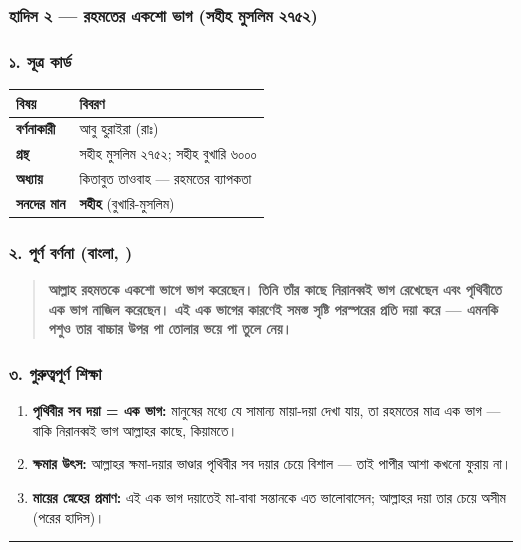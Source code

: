 \subsubsection*{হাদিস ২ — রহমতের একশো ভাগ (সহীহ মুসলিম ২৭৫২)}

\subsubsection*{১. সূত্র কার্ড}

\begin{table}[h]\centering\small
\begin{tabular}{ll}
বিষয় & বিবরণ \\
\hline
\textbf{বর্ণনাকারী} & আবু হুরাইরা (রাঃ) \\
\textbf{গ্রন্থ} & সহীহ মুসলিম ২৭৫২; সহীহ বুখারি ৬০০০ \\
\textbf{অধ্যায়} & কিতাবুত তাওবাহ — রহমতের ব্যাপকতা \\
\textbf{সনদের মান} & \textbf{সহীহ} (বুখারি-মুসলিম) \\
\hline
\end{tabular}
\end{table}

\subsubsection*{২. পূর্ণ বর্ণনা (বাংলা, )}

\begin{quote}
\textbf{আল্লাহ রহমতকে একশো ভাগে ভাগ করেছেন। তিনি তাঁর কাছে নিরানব্বই ভাগ রেখেছেন এবং পৃথিবীতে এক ভাগ নাজিল করেছেন। এই এক ভাগের কারণেই সমস্ত সৃষ্টি পরস্পরের প্রতি দয়া করে — এমনকি পশুও তার বাচ্চার উপর পা তোলার ভয়ে পা তুলে নেয়।}
\end{quote}

\subsubsection*{৩. গুরুত্বপূর্ণ শিক্ষা}

\begin{enumerate}
\item \textbf{পৃথিবীর সব দয়া = এক ভাগ:} মানুষের মধ্যে যে সামান্য মায়া-দয়া দেখা যায়, তা রহমতের মাত্র এক ভাগ — বাকি নিরানব্বই ভাগ আল্লাহর কাছে, কিয়ামতে।
\item \textbf{ক্ষমার উৎস:} আল্লাহর ক্ষমা-দয়ার ভাণ্ডার পৃথিবীর সব দয়ার চেয়ে বিশাল — তাই পাপীর আশা কখনো ফুরায় না।
\item \textbf{মায়ের স্নেহের প্রমাণ:} এই এক ভাগ দয়াতেই মা-বাবা সন্তানকে এত ভালোবাসেন; আল্লাহর দয়া তার চেয়ে অসীম (পরের হাদিস)।
\end{enumerate}
\medskip\hrule\medskip

